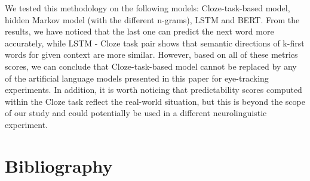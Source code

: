 \documentclass[a4paper]{article}
\begin{document}
We tested this methodology on the following models: Cloze-task-based model, hidden Markov model (with the different n-grams), LSTM and BERT. From the results, we have noticed that the last one can predict the next word more accurately, while LSTM - Cloze task pair shows that semantic directions of k-first words for given context are more similar. However, based on all of these metrics scores, we can conclude that Cloze-task-based model cannot be replaced by any of the artificial language models presented in this paper for eye-tracking experiments. In addition, it is worth noticing that predictability scores computed within the Cloze task reflect the real-world situation, but this is beyond the scope of our study and could potentially be used in a different neurolinguistic experiment.
\section{Bibliography}


\end{document}
